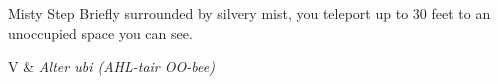 \begin{Spell}[
  level={2nd},
  time={1 bonus action},
  range={Self},
  components={V},
  duration={Instantaneous},
  school={Conjuration},
  attack={None},
  effect={Teleportation}
]{Misty Step}
Briefly surrounded by silvery mist, you teleport up to 30 feet to an unoccupied space you can see.

\begin{components}
V & \textit{Alter ubi (AHL-tair OO-bee)}
\end{components}
\end{Spell}


